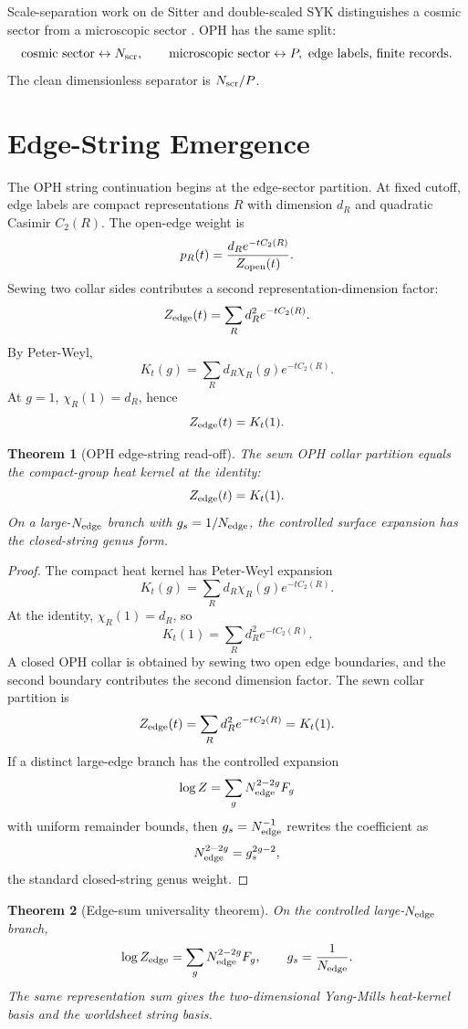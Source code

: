 \documentclass[11pt]{article}
\newtheorem{theorem}{Theorem}[section]
\theoremstyle{remark}
\theoremstyle{plain}
\begin{document}
Scale-separation work on de Sitter and double-scaled SYK distinguishes a cosmic sector from a
microscopic sector \cite{DSScales2022}. OPH has the same split:
\[
\text{cosmic sector}\leftrightarrow N_{\rm scr},
\qquad
\text{microscopic sector}\leftrightarrow P,\text{ edge labels, finite records}.
\]
The clean dimensionless separator is \(N_{\rm scr}/P\).

\section{Edge-String Emergence}

The OPH string continuation begins at the edge-sector partition. At fixed cutoff, edge labels are
compact representations \(R\) with dimension \(d_R\) and quadratic Casimir \(C_2(R)\). The
open-edge weight is
\[
p_R(t)=\frac{d_R e^{-t C_2(R)}}{Z_{\rm open}(t)}.
\]
Sewing two collar sides contributes a second representation-dimension factor:
\[
Z_{\rm edge}(t)=\sum_R d_R^2 e^{-tC_2(R)}.
\]
By Peter-Weyl,
\[
K_t(g)=\sum_R d_R\chi_R(g)e^{-tC_2(R)}.
\]
At \(g=1\), \(\chi_R(1)=d_R\), hence
\[
Z_{\rm edge}(t)=K_t(1).
\]

\begin{theorem}[OPH edge-string read-off]
The sewn OPH collar partition equals the compact-group heat kernel at the identity:
\[
Z_{\rm edge}(t)=K_t(1).
\]
On a large-\(N_{\rm edge}\) branch with \(g_s=1/N_{\rm edge}\), the controlled surface expansion
has the closed-string genus form.
\end{theorem}

\begin{proof}
The compact heat kernel has Peter-Weyl expansion
\[
K_t(g)=\sum_R d_R\chi_R(g)e^{-tC_2(R)}.
\]
At the identity, \(\chi_R(1)=d_R\), so
\[
K_t(1)=\sum_R d_R^2e^{-tC_2(R)}.
\]
A closed OPH collar is obtained by sewing two open edge boundaries, and the second boundary
contributes the second dimension factor. The sewn collar partition is
\[
Z_{\rm edge}(t)=\sum_R d_R^2e^{-tC_2(R)}=K_t(1).
\]
If a distinct large-edge branch has the controlled expansion
\[
\log Z=\sum_g N_{\rm edge}^{2-2g}F_g
\]
with uniform remainder bounds, then \(g_s=N_{\rm edge}^{-1}\) rewrites the coefficient as
\[
N_{\rm edge}^{2-2g}=g_s^{2g-2},
\]
the standard closed-string genus weight.
\end{proof}

\begin{theorem}[Edge-sum universality theorem]
On the controlled large-\(N_{\rm edge}\) branch,
\[
\log Z_{\rm edge}
=
\sum_g N_{\rm edge}^{2-2g}F_g,
\qquad
g_s=\frac1{N_{\rm edge}}.
\]
The same representation sum gives the two-dimensional Yang-Mills heat-kernel basis and the
worldsheet string basis.
\end{theorem}
\end{document}
